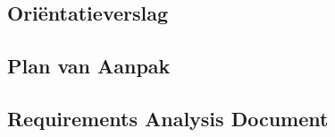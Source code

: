 \subsection{Ori\"{e}ntatieverslag}

\subsection{Plan van Aanpak}

\subsection{Requirements Analysis Document}

